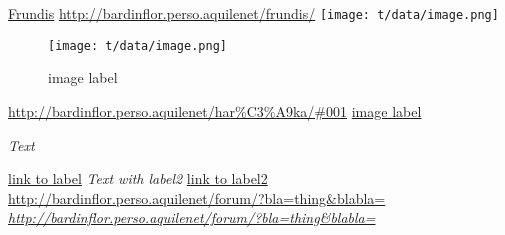 \href{http://bardinflor.perso.aquilenet/frundis/}{Frundis}
\url{http://bardinflor.perso.aquilenet/frundis/}
\texttt{[image: t/data/image.png]}

\begin{center}
\begin{figure}[htbp]
\texttt{[image: t/data/image.png]}
\caption{image label}
\label{fig:1}
\end{figure}
\end{center}
\url{http://bardinflor.perso.aquilenet/har\%C3\%A9ka/#001}
\hyperref[fig:1]{image label}

\hypertarget{label1}{\emph{Text}}
\hyperlink{label1}{link to label}
\hypertarget{label2}{\emph{Text with label2}}
\hyperlink{label2}{link to label2}
\url{http://bardinflor.perso.aquilenet/forum/?bla=thing&blabla=}
\emph{\url{http://bardinflor.perso.aquilenet/forum/?bla=thing&blabla=}}

